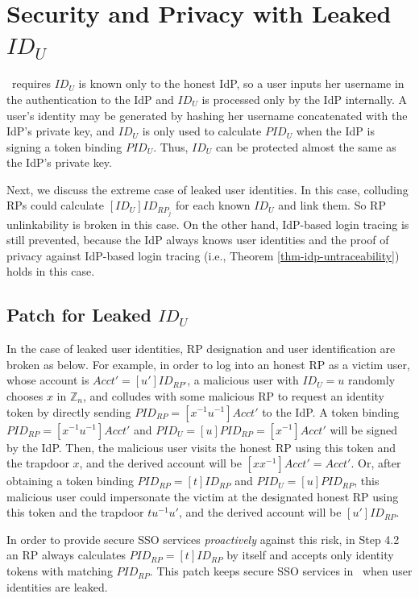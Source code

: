 \appendix

\section{Security and Privacy with Leaked $ID_U$}
\label{sp-leak-uid}
\usso\ requires $ID_U$ is known only to the honest IdP,
so a user inputs her username in the authentication to the IdP and $ID_U$ is processed only by the IdP internally.
A user's identity may be generated by hashing her username concatenated with the IdP's private key, 
    and $ID_U$ is only used to calculate $PID_{U}$ when the IdP is signing a token binding $PID_{U}$.
Thus, $ID_U$ can be protected almost the same as the IdP's private key.

Next, we discuss the extreme case of leaked user identities.
In this case,
    colluding RPs could calculate $[ID_U]ID_{RP_j}$ for each known $ID_U$ and link them.
So RP unlinkability is broken in this case.
On the other hand, IdP-based login tracing is still prevented,
    because the IdP always knows user identities and the proof of privacy against IdP-based login tracing (i.e., Theorem \ref{thm-idp-untraceability}) holds in this case.

\subsection{Patch for Leaked $ID_U$}
In the case of leaked user identities,
RP designation and user identification are broken as below.
For example, in order to log into an honest RP as a victim user, whose account is $Acct' = [u']ID_{RP'}$,
    a malicious user with $ID_U = u$ randomly chooses $x$ in $\mathbb{Z}_n$,
    and colludes with some malicious RP to request an identity token by directly sending $PID_{RP} = [x^{-1}u^{-1}]Acct'$ to the IdP.
A token binding $PID_{RP} = [x^{-1}u^{-1}]Acct'$ and $PID_U = [u]PID_{RP} = [x^{-1}]Acct'$ will be signed by the IdP.
Then, the malicious user visits the honest RP using this token and the trapdoor $x$,
    and the derived account will be $[xx^{-1}]Acct'=Acct'$.
Or, after obtaining a token binding $PID_{RP} = [t]ID_{RP}$ and $PID_U = [u]PID_{RP}$,
    this malicious user could impersonate the victim at the designated honest RP
     using this token and the trapdoor $tu^{-1}u'$, and the derived account will be $[u']ID_{RP}$.

In order to provide secure SSO services \emph{proactively} against this risk,
     in Step 4.2 an RP always calculates $PID_{RP} = [t]ID_{RP}$ by itself and
        accepts only identity tokens with matching $PID_{RP}$.
This patch keeps secure SSO services in \usso\ when user identities are leaked.

